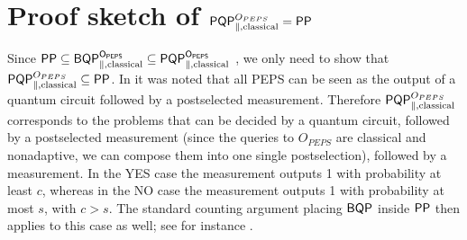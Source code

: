 \documentclass[11pt]{article}
\theoremstyle{definition}
\theoremstyle{remark}
\newcommand\PP{\sf{PP}}
\newcommand\BQP{{\sf{BQP}}}
\newcommand\PQP{{\sf{PQP}}}
\begin{document}
\appendix

\section{Proof sketch of $\PQP^{O_{PEPS}}_{\parallel,\text{classical}} = \PP$} \label{app:peps}
Since $\PP \subseteq \BQP^{O_{PEPS}}_{\parallel,\text{classical}} \subseteq \PQP^{O_{PEPS}}_{\parallel,\text{classical}}$ \cite{swv07}, we only need to show that $\PQP^{O_{PEPS}}_{\parallel,\text{classical}} \subseteq \PP$. In \cite{swv07} it was noted that all PEPS can be seen as the output of a quantum circuit followed by a postselected measurement. Therefore $\PQP^{O_{PEPS}}_{\parallel,\text{classical}}$ corresponds to the problems that can be decided by a quantum circuit, followed by a postselected measurement (since the queries to $O_{PEPS}$ are classical and nonadaptive, we can compose them into one single postselection), followed by a measurement. In the YES case the measurement outputs 1 with probability at least $c$, whereas in the NO case the measurement outputs 1 with probability at most $s$, with $c > s$. The standard counting argument placing $\BQP$ inside $\PP$ then applies to this case as well; see for instance \cite[Propositions~2~and~3]{aaronson05}.
\end{document}
